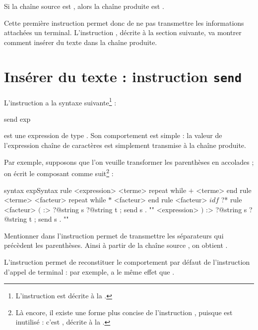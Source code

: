 Si la chaîne source est , alors la chaîne produite est .

Cette première instruction permet donc de ne pas transmettre les informations attachées un terminal. L'instruction , décrite à la section suivante, va montrer comment insérer du texte dans la chaîne produite.










\section{Insérer du texte : instruction \texttt{send}}

L'instruction  a la syntaxe suivante\footnote{L'instruction  est décrite à la .} :
\begin{galgascode}
send exp
\end{galgascode}

 est une expression de type . Son comportement est simple : la valeur de l'expression chaîne de caractères est simplement transmise à la chaîne produite.

Par exemple, supposons que l'on veuille transformer les parenthèses en accolades ; on écrit le composant  comme suit\footnote{Là encore, il existe une forme plus concise de l'instruction , puisque  est inutilisé : c'est , décrite  à la .} :
\begin{galgascode}
syntax expSyntax {
  rule <expression> {
    <terme>
    repeat while $+$ <terme> end
  }
  rule <terme> {
    <facteur>
    repeat while $*$ <facteur> end
  }
  rule <facteur> {
    $idf$ ?*
  }
  rule <facteur> {
    $($ :> ?@string s ?@string t ; send s . "{"
    <expression>
    $)$ :> ?@string s ?@string t ; send s . "}"
  }
}
\end{galgascode}

Mentionner  dans l'instruction  permet de transmettre les séparateurs qui précèdent les parenthèses. Ainsi à partir de la chaîne source , on obtient .


L'instruction  permet de reconstituer le comportement par défaut de l'instruction d'appel de terminal : par exemple,  a le même effet que \galgas{$($ ;}.



